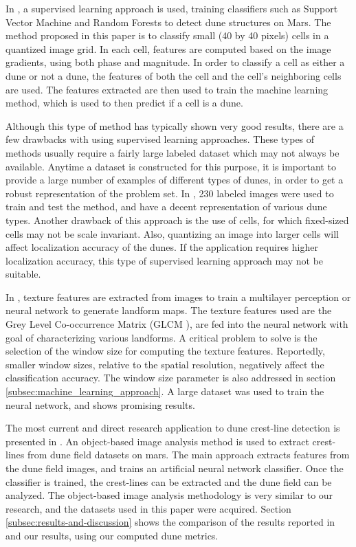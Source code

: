 In \cite{BandeiraMarques}, a supervised learning approach is used, training classifiers such as Support Vector Machine and Random Forests to detect dune structures on Mars. The method proposed in this paper is to classify small (40 by 40 pixels) cells in a quantized image grid. In each cell, features are computed based on the image gradients, using both phase and magnitude. In order to classify a cell as either a dune or not a dune, the features of both the cell and the cell's neighboring cells are used. The features extracted are then used to train the machine learning method, which is used to then predict if a cell is a dune.

Although this type of method has typically shown very good results, there are a few drawbacks with using supervised learning approaches. These types of methods usually require a fairly large labeled dataset which may not always be available. Anytime a dataset is constructed for this purpose, it is important to provide a large number of examples of different types of dunes, in order to get a robust representation of the problem set. In \cite{BandeiraMarques}, 230 labeled images were used to train and test the method, and have a decent representation of various dune types. Another drawback of this approach is the use of cells, for which fixed-sized cells may not be scale invariant. Also, quantizing an image into larger cells	will affect localization accuracy of the dunes. If the application requires higher localization accuracy, this type of supervised learning approach may not be suitable.

In \cite{2011_neural_network_based_dunal_landform_mapping}, texture features are extracted from images to train a multilayer perception or neural network to generate landform maps. The texture features used are the Grey Level Co-occurrence Matrix (GLCM \cite{1973_textural_features_image_classification}), are fed into the neural network with goal of characterizing various landforms. A critical problem to solve is the selection of the window size for computing the texture features. Reportedly, smaller window sizes, relative to the spatial resolution, negatively affect the classification accuracy. The window size parameter is also addressed in section \ref{subsec:machine_learning_approach}. A large dataset was used to train the neural network, and shows promising results.

The most current and direct research application to dune crest-line detection is presented in \cite{vaz_object_based_dune_analysis}. An object-based image analysis method is used to extract crest-lines from dune field datasets on mars. The main approach extracts features from the dune field images, and trains an artificial neural network classifier. Once the classifier is trained, the crest-lines can be extracted and the dune field can be analyzed. The object-based image analysis methodology is very similar to our research, and the datasets used in this paper were acquired. Section \ref{subsec:results-and-discussion} shows the comparison of the results reported in \cite{vaz_object_based_dune_analysis} and our results, using our computed dune metrics.

